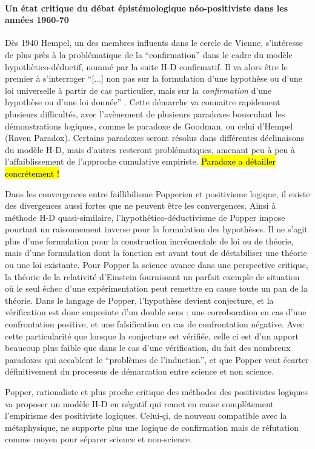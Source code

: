 \paragraph{Un état critique du débat épistémologique néo-positiviste dans les années 1960-70}

Dès 1940 Hempel, un des membres influents dans le cercle de Vienne, s'intéresse de plus près à la problématique de la \enquote{confirmation} dans le cadre du modèle hypothètico-déductif, nommé par la suite H-D confirmatif. Il va alors être le premier à s'interroger \enquote{[...] non pas sur la formulation d'une hypothèse ou d'une loi universelle à partir de cas particulier, mais sur la \textit{confirmation} d'une hypothèse ou d'une loi donnée} \autocite{Lecourt2006}. Cette démarche va connaitre rapidement plusieurs difficultés, avec l’avènement de plusieurs paradoxes bousculant les démonstrations logiques, comme le paradoxe de Goodman, ou celui d'Hempel (Raven Paradox). Certains paradoxes seront résolus dans différentes déclinaisons du modèle H-D, mais d'autres resteront problématiques, amenant peu à peu à l'affaiblissement de l'approche cumulative empiriste. \hl{Paradoxe a détailler concrétement !}

Dans les convergences entre faillibilisme Popperien et positivisme logique, il existe des divergences aussi fortes que ne peuvent être les convergences. Ainsi à méthode H-D quasi-similaire, l'hypothético-déductivisme de Popper impose pourtant un raisonnement inverse pour la formulation des hypothèses. Il ne s'agit plus d'une formulation pour la construction incrémentale de loi ou de théorie, mais d'une formulation dont la fonction est avant tout de déstabiliser une théorie ou une loi existante. Pour Popper la science avance dans une perspective critique, la théorie de la relativité d'Einstein fournissant un parfait exemple de situation où le seul échec d'une expérimentation peut remettre en cause toute un pan de la théorie. Dans le langage de Popper, l'hypothèse devient conjecture, et la vérification est donc empreinte d'un double sens : une corroboration en cas d'une confrontation positive, et une falsification en cas de confrontation négative. Avec cette particularité que lorsque la conjecture est vérifiée, celle ci est d'un apport beaucoup plus faible que dans le cas d'une vérification, du fait des nombreux paradoxes qui accablent le \enquote{problèmes de l'induction}, et que Popper veut écarter définitivement du processus de démarcation entre science et non science.

Popper, rationaliste et plus proche critique des méthodes des positivistes logiques va proposer un modèle H-D en négatif qui remet en cause complètement l'empirisme des positiviste logiques. Celui-çi, de nouveau compatible avec la métaphysique, ne supporte plus une logique de confirmation mais de réfutation comme moyen pour séparer science et non-science.

